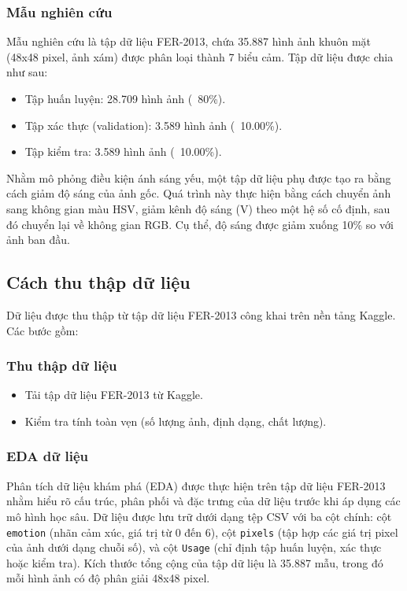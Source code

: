 \subsubsection{Mẫu nghiên cứu} %
Mẫu nghiên cứu là tập dữ liệu FER-2013, chứa 35.887 hình ảnh khuôn mặt (48x48 pixel, ảnh xám) được phân loại thành 7 biểu cảm. Tập dữ liệu được chia như sau:
\begin{itemize}
    \item Tập huấn luyện: 28.709 hình ảnh (~80\%).
    \item Tập xác thực (validation): 3.589 hình ảnh (~10.00\%).
    \item Tập kiểm tra: 3.589 hình ảnh (~10.00\%).
\end{itemize}

Nhằm mô phỏng điều kiện ánh sáng yếu, một tập dữ liệu phụ được tạo ra bằng cách giảm độ sáng của ảnh gốc. Quá trình này thực hiện bằng cách chuyển ảnh sang không gian màu HSV, giảm kênh độ sáng (V) theo một hệ số cố định, sau đó chuyển lại về không gian RGB. Cụ thể, độ sáng được giảm xuống 10\% so với ảnh ban đầu.





\subsection{Cách thu thập dữ liệu} %
Dữ liệu được thu thập từ tập dữ liệu FER-2013 công khai trên nền tảng Kaggle. Các bước gồm:

\subsubsection*{Thu thập dữ liệu}
\begin{itemize}
    \item Tải tập dữ liệu FER-2013 từ Kaggle.
    \item Kiểm tra tính toàn vẹn (số lượng ảnh, định dạng, chất lượng).
\end{itemize}

\subsubsection{EDA dữ liệu} %
Phân tích dữ liệu khám phá (EDA) được thực hiện trên tập dữ liệu FER-2013 nhằm hiểu rõ cấu trúc, phân phối và đặc trưng của dữ liệu trước khi áp dụng các mô hình học sâu. Dữ liệu được lưu trữ dưới dạng tệp CSV với ba cột chính: cột \texttt{emotion} (nhãn cảm xúc, giá trị từ 0 đến 6), cột \texttt{pixels} (tập hợp các giá trị pixel của ảnh dưới dạng chuỗi số), và cột \texttt{Usage} (chỉ định tập huấn luyện, xác thực hoặc kiểm tra). Kích thước tổng cộng của tập dữ liệu là 35.887 mẫu, trong đó mỗi hình ảnh có độ phân giải 48x48 pixel.


